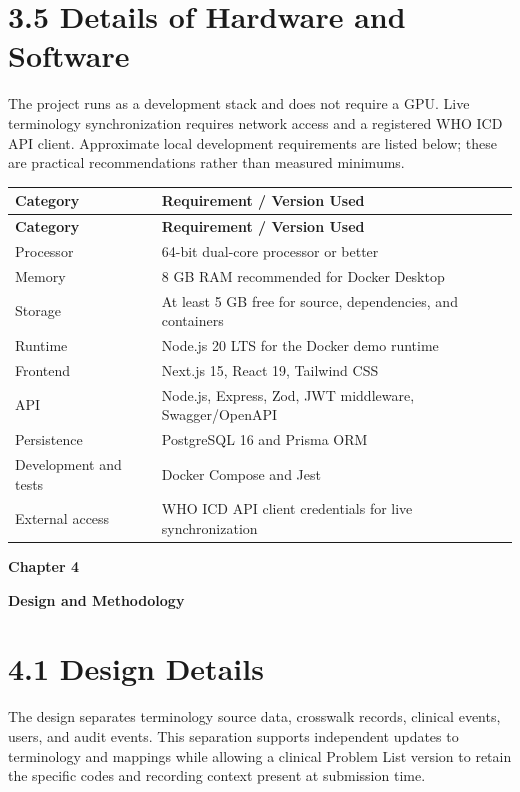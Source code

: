 \documentclass[12pt,a4paper,oneside]{report}
\begin{document}
\section*{3.5 Details of Hardware and Software}
The project runs as a development stack and does not require a GPU. Live terminology synchronization requires network access and a registered WHO ICD API client. Approximate local development requirements are listed below; these are practical recommendations rather than measured minimums.

\begin{longtable}{|p{}|p{}|}
\hline
\textbf{Category} & \textbf{Requirement / Version Used} \\ \hline
\endfirsthead
\hline \textbf{Category} & \textbf{Requirement / Version Used} \\ \hline\endhead
Processor & 64-bit dual-core processor or better \\ \hline
Memory & 8 GB RAM recommended for Docker Desktop \\ \hline
Storage & At least 5 GB free for source, dependencies, and containers \\ \hline
Runtime & Node.js 20 LTS for the Docker demo runtime \\ \hline
Frontend & Next.js 15, React 19, Tailwind CSS \\ \hline
API & Node.js, Express, Zod, JWT middleware, Swagger/OpenAPI \\ \hline
Persistence & PostgreSQL 16 and Prisma ORM \\ \hline
Development and tests & Docker Compose and Jest \\ \hline
External access & WHO ICD API client credentials for live synchronization \\ \hline
\end{longtable}
\vspace{4pt}
\clearpage
\clearpage\begin{center}\Large\textbf{Chapter 4}\end{center}
\begin{center}\LARGE\textbf{\textbf{Design and Methodology}}\end{center}\vspace{8pt}
\section*{4.1 Design Details}
The design separates terminology source data, crosswalk records, clinical events, users, and audit events. This separation supports independent updates to terminology and mappings while allowing a clinical Problem List version to retain the specific codes and recording context present at submission time.
\end{document}
